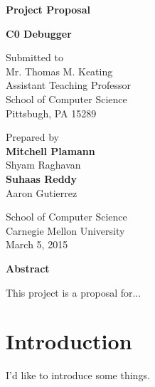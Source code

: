 \documentclass[11pt]{article}
\begin{document}
\setlength{\parindent}{2em}



\begin{titlepage}
\clearpage
\thispagestyle{empty}

\begin{center}
{\bf Project Proposal}

{\bf C0 Debugger}

Submitted to\\
Mr. Thomas M. Keating\\
Assistant Teaching Professor\\
School of Computer Science\\
Pittsbugh, PA 15289

Prepared by\\
{\bf Mitchell Plamann}\\
Shyam Raghavan\\
{\bf Suhaas Reddy}\\
Aaron Gutierrez

School of Computer Science\\
Carnegie Mellon University\\
March 5, 2015

{\bf Abstract}
\end{center}
\par
This project is a proposal for...
\end{titlepage}

\tableofcontents
\newpage


\section{Introduction}
I'd like to introduce some things.
\end{document}
